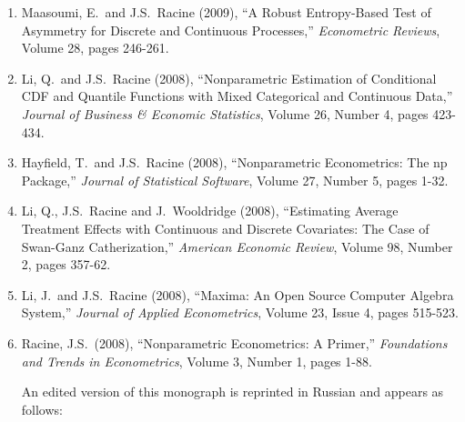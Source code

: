 \documentclass[
]{article}
\begin{document}
\begin{enumerate}
  of Regression Functions with Discrete Regressors,'' \emph{Econometric
  Theory}, Volume 25, pages 1-42.
\item
  Maasoumi, E.~and J.S.~Racine (2009), ``A Robust Entropy-Based Test of
  Asymmetry for Discrete and Continuous Processes,'' \emph{Econometric
  Reviews}, Volume 28, pages 246-261.
\item
  Li, Q.~and J.S.~Racine (2008), ``Nonparametric Estimation of
  Conditional CDF and Quantile Functions with Mixed Categorical and
  Continuous Data,'' \emph{Journal of Business \& Economic Statistics},
  Volume 26, Number 4, pages 423-434.
\item
  Hayfield, T.~and J.S.~Racine (2008), ``Nonparametric Econometrics: The
  np Package,'' \emph{Journal of Statistical Software}, Volume 27,
  Number 5, pages 1-32.
\item
  Li, Q., J.S.~Racine and J.~Wooldridge (2008), ``Estimating Average
  Treatment Effects with Continuous and Discrete Covariates: The Case of
  Swan-Ganz Catherization,'' \emph{American Economic Review}, Volume 98,
  Number 2, pages 357-62.
\item
  Li, J.~and J.S.~Racine (2008), ``Maxima: An Open Source Computer
  Algebra System,'' \emph{Journal of Applied Econometrics}, Volume 23,
  Issue 4, pages 515-523.
\item
  Racine, J.S.~(2008), ``Nonparametric Econometrics: A Primer,''
  \emph{Foundations and Trends in Econometrics}, Volume 3, Number 1,
  pages 1-88.

  An edited version of this monograph is reprinted in Russian and
  appears as follows:


\end{enumerate}
\end{document}
